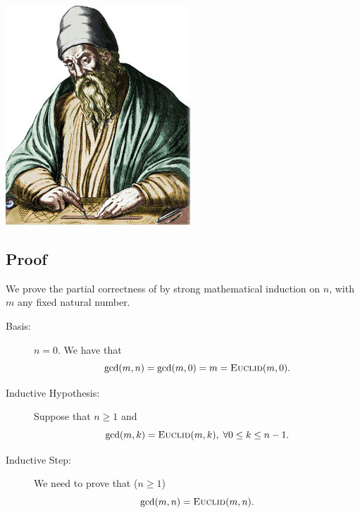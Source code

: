 \documentclass{tufte-handout}
\begin{document}
\begin{CJK*}{UTF8}{gbsn}
\begin{marginfigure}%
  \includegraphics[width=0.60\linewidth]{figs/euclid}
  \label{fig:euclid}
\end{marginfigure}



\subsection{Proof}


We prove the partial correctness of \euclid{} by strong mathematical induction on $n$,
with $m$ any fixed natural number.

\begin{description}
  \item[Basis:] $n = 0$. We have that
    \[
      \gcd(m,n) = \gcd(m,0) = m = \textsc{Euclid}(m,0).
    \]
  \item[Inductive Hypothesis:]
    Suppose that $n \ge 1$ and
    \[
      \gcd(m, k) = \textsc{Euclid}(m, k), \;\forall 0 \le k \le n - 1.
    \]
  \item[Inductive Step:]
    We need to prove that ($n \ge 1$)
    \[
      \gcd(m, n) = \textsc{Euclid}(m, n).
    \]


\end{description}
\end{CJK*}
\end{document}
